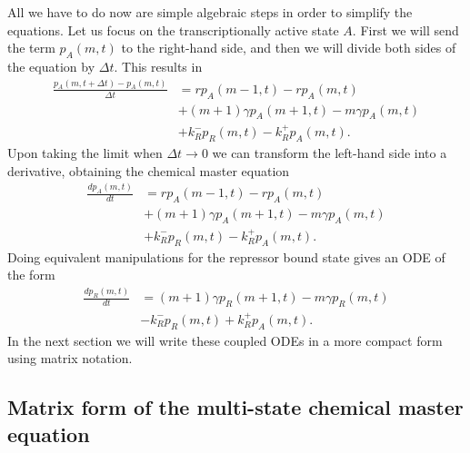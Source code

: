 All we have to do now are simple algebraic steps in order to simplify the 
equations. Let us focus on the transcriptionally active state $A$. First we will
send the term $p_A(m, t)$ to the right-hand side, and then we will divide both
sides of the equation by $\Delta t$. This results in
\begin{equation}
\begin{aligned}
\frac{p_A(m, t + \Delta t) - p_A(m, t)}{\Delta t} &=
r p_A(m-1, t) - r p_A(m, t)\\
&+ (m+1)\gamma p_A(m+1, t)
- m \gamma p_A(m, t)\\
&+k_R^- p_R(m, t)
-k_R^+ p_A(m, t).
\end{aligned}
\end{equation}
Upon taking the limit when $\Delta t \rightarrow 0$ we can transform the 
left-hand side into a derivative, obtaining the chemical master equation
\begin{equation}
\begin{aligned}
\frac{d p_A(m, t)}{dt} &=
r p_A(m-1, t) - r p_A(m, t)\\
&+ (m+1)\gamma p_A(m+1, t)
- m \gamma p_A(m, t)\\
&+k_R^- p_R(m, t)
-k_R^+ p_A(m, t).
\end{aligned}
\end{equation}
Doing equivalent manipulations for the repressor bound state gives an ODE of the
form
\begin{equation}
\begin{aligned}
\frac{d p_R(m, t)}{dt} &=
(m+1)\gamma p_R(m+1, t)
- m \gamma p_R(m, t)\\
&-k_R^- p_R(m, t)
+k_R^+ p_A(m, t).
\end{aligned}
\end{equation}
In the next section we will write these coupled ODEs in a more compact form using
matrix notation.







\subsection{Matrix form of the multi-state chemical master equation}

